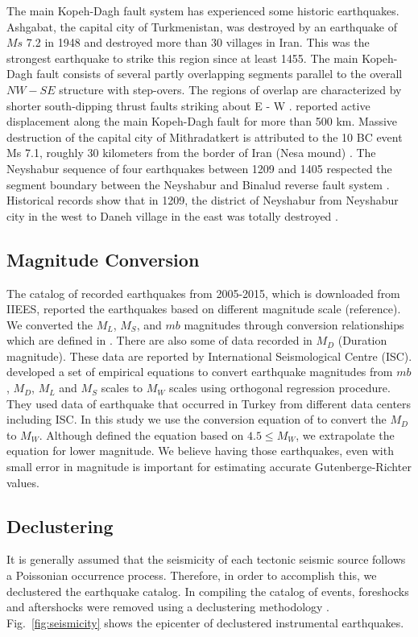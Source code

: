 The main Kopeh-Dagh fault system has experienced some historic earthquakes. Ashgabat, the capital city of Turkmenistan, was destroyed by an earthquake of $Ms$ 7.2 in 1948 and destroyed more than 30 villages in Iran. This was the strongest earthquake to strike this region since at least 1455.
The main Kopeh-Dagh fault consists of several partly overlapping segments parallel to the overall $NW - SE$ structure with step-overs. The regions of overlap are characterized by shorter south-dipping thrust faults striking about E - W \citep{Berberian2001}. \citet{Trifonov1978} reported active displacement along the main Kopeh-Dagh fault for more than 500 km. 
Massive destruction of the capital city of Mithradatkert is attributed to the 10 BC event Ms 7.1, roughly 30 kilometers from the border of Iran (Nesa mound) \citep{Berberian2001}.
The Neyshabur sequence of four earthquakes between 1209 and 1405 respected the segment boundary between the Neyshabur and Binalud reverse fault system \citep{Berberian1999}.
Historical records show that in 1209, the district of Neyshabur from Neyshabur city in the west to Daneh village in the east was totally destroyed \citep{Berberian1999}.

\subsection{Magnitude Conversion}
\noindent
The catalog of recorded earthquakes from 2005-2015, which is downloaded from IIEES, reported the earthquakes based on different magnitude scale (reference). We converted the $M_L$, $M_S$, and $mb$ magnitudes through conversion relationships which are defined in \citet{Zare2014}. There are also some of data recorded in $M_D$ (Duration magnitude). These data are reported by International Seismological Centre (ISC).  \citet{Deniz2010} developed a set of empirical equations to convert earthquake magnitudes from $mb$, $M_D$, $M_L$ and $M_S$ scales to $M_W$ scales using orthogonal regression procedure. They used data of earthquake that occurred in Turkey from different data centers including ISC. In this study we use the conversion equation of \citet{Deniz2010} to convert the $M_D$ to $M_W$. Although \citet{Deniz2010} defined the equation based on $4.5\leqslant M_W$, we extrapolate the equation for lower magnitude. We believe having those earthquakes, even with small error  in magnitude is important for estimating accurate  Gutenberge-Richter values.

\subsection{Declustering}
\noindent
It is generally assumed that the seismicity of each tectonic seismic source follows a Poissonian occurrence process. Therefore, in order to accomplish this, we declustered the earthquake catalog. In compiling the catalog of events, foreshocks and aftershocks were removed using a declustering methodology \citet{Gardner1974}. Fig.~\ref{fig:seismicity} shows the epicenter of declustered instrumental  earthquakes.

